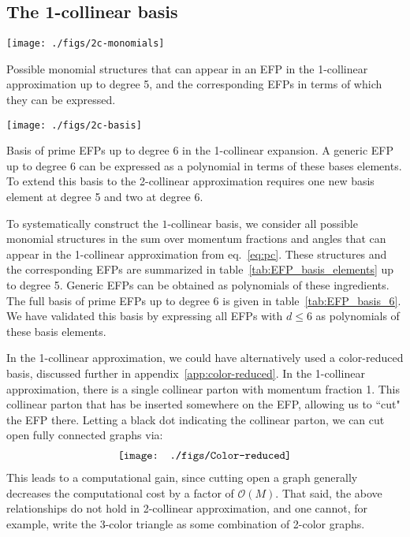 \documentclass[a4paper,11pt]{article}
\newcommand{\eq}[1]{eq.~\eqref{eq:#1}}
\newcommand{\app}[1]{appendix~\ref{app:#1}}
\newcommand{\tab}[1]{table~\ref{tab:#1}}
\begin{document}
\subsection{The 1-collinear basis}
\label{sec:1c_basis_present}

        \begin{table}[p]
        \centering
      \texttt{[image: ./figs/2c-monomials]}  
      \caption{Possible monomial structures that can appear in an EFP in the 1-collinear approximation up to degree 5, and the corresponding EFPs in terms of which they can be expressed. \label{tab:EFP_basis_elements}}
     \end{table}          


        \begin{table}[t]\centering
      \texttt{[image: ./figs/2c-basis]}  
      \caption{Basis of prime EFPs up to degree 6 in the 1-collinear expansion. A generic EFP up to degree 6 can be expressed as a polynomial in terms of these bases elements. To extend this basis to the 2-collinear approximation requires one new basis element at degree 5 and two at degree 6. \label{tab:EFP_basis_6}}
     \end{table}

To systematically construct the $1$-collinear basis, we consider all possible monomial structures in the sum over momentum fractions and angles that can appear in the 1-collinear approximation from \eq{pc}.
%
These structures and the corresponding EFPs are summarized in \tab{EFP_basis_elements} up to degree 5.
%
Generic EFPs can be obtained as polynomials of these ingredients.
%
The full basis of prime EFPs up to degree 6 is given in \tab{EFP_basis_6}.
%
We have validated this basis by expressing all EFPs with $d \le 6$ as polynomials of these basis elements. 


In the 1-collinear approximation, we could have alternatively used a color-reduced basis, discussed further in \app{color-reduced}.
%
In the 1-collinear approximation, there is a single collinear parton with momentum fraction 1.
%
This collinear parton that has be inserted somewhere on the EFP, allowing us to ``cut" the EFP there.
%
Letting a black dot indicating the collinear parton, we can cut open fully connected graphs via: 
\begin{align}
\label{eq:color-reduced}
 \texttt{[image: ./figs/Color-reduced]}
 \raisetag{2.3\baselineskip}    
\end{align}
%
This leads to a computational gain, since cutting open a graph generally decreases the computational cost by a factor of $\mathcal{O}(M)$.
%
That said, the above relationships do not hold in 2-collinear approximation, and one cannot, for example, write the 3-color triangle as some combination of 2-color graphs.
\end{document}
